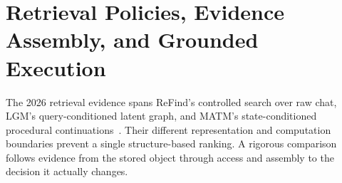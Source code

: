 \chapter{Retrieval Policies, Evidence Assembly, and Grounded Execution}\label{ch:C16}

The 2026 retrieval evidence spans ReFind's controlled search over raw chat, LGM's query-conditioned latent graph, and MATM's state-conditioned procedural continuations~\cite{cumb2026refindv2,cumb2026lgmv2,kim2026matm}. Their different representation and computation boundaries prevent a single structure-based ranking. A rigorous comparison follows evidence from the stored object through access and assembly to the decision it actually changes.









